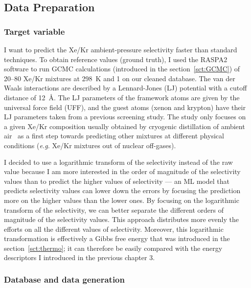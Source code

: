 \documentclass[main]{subfiles}
\begin{document}
\subsection{Data Preparation}


\subsubsection{Target variable}

I want to predict the Xe/Kr ambient-pressure selectivity faster than standard techniques. To obtain reference values (ground truth), I used the RASPA2 software\autocite{dubbeldam2016} to run GCMC calculations (introduced in the section~\ref{sct:GCMC}) of 20–80 Xe/Kr mixtures at \SI{298}{\kelvin} and \SI{1}{\atm} on our cleaned database. The van der Waals interactions are described by a Lennard-Jones (LJ) potential with a cutoff distance of \SI{12}{\angstrom}. The LJ parameters of the framework atoms are given by the universal force field (UFF),\autocite{rappe1992} and the guest atoms (xenon and krypton) have their LJ parameters taken from a previous screening study.\autocite{Ryan_2010} The study only focuses on a given Xe/Kr composition usually obtained by cryogenic distillation of ambient air~\autocite{kerry2007industrial} as a first step towards predicting other mixtures at different physical conditions (\emph{e.g.} Xe/Kr mixtures out of nuclear off-gases). 

I decided to use a logarithmic transform of the selectivity instead of the raw value because I am more interested in the order of magnitude of the selectivity values than to predict the higher values of selectivity --- an ML model that predicts selectivity values can lower down the errors by focusing the prediction more on the higher values than the lower ones. By focusing on the logarithmic transform of the selectivity, we can better separate the different orders of magnitude of the selectivity values. This approach distributes more evenly the efforts on all the different values of selectivity. Moreover, this logarithmic transformation is effectively a Gibbs free energy that was introduced in the section~\ref{sct:thermo}; it can therefore be easily compared with the energy descriptors I introduced in the previous chapter 3.

\subsubsection{Database and data generation}
\end{document}
